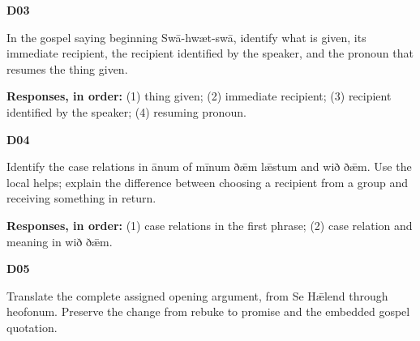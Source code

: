 \par\begin{minipage}{\linewidth}\raggedright
\textbf{D03}

In the gospel saying beginning Swā-hwæt-swā, identify what is given, its immediate recipient, the recipient identified by the speaker, and the pronoun that resumes the thing given.

\textbf{Responses, in order:} (1) thing given; (2) immediate recipient; (3) recipient identified by the speaker; (4) resuming pronoun.

\end{minipage}\par\addvspace{4pt}

\par\begin{minipage}{\linewidth}\raggedright
\textbf{D04}

Identify the case relations in ānum of mīnum ðǣm lǣstum and wið ðǣm. Use the local helps; explain the difference between choosing a recipient from a group and receiving something in return.

\textbf{Responses, in order:} (1) case relations in the first phrase; (2) case relation and meaning in wið ðǣm.

\end{minipage}\par\addvspace{4pt}

\par\begin{minipage}{\linewidth}\raggedright
\textbf{D05}

Translate the complete assigned opening argument, from Se Hǣlend through heofonum. Preserve the change from rebuke to promise and the embedded gospel quotation.

\end{minipage}\par\addvspace{4pt}

